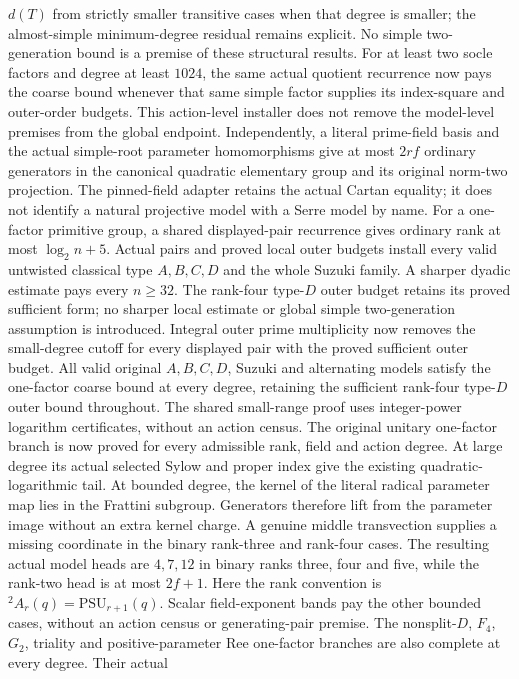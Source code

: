 $d(T)$ from strictly smaller transitive cases when that degree is smaller;
the almost-simple minimum-degree residual remains explicit. No simple
two-generation bound is a premise of these structural results.
For at least two socle factors and degree at least $1024$, the same
actual quotient recurrence now pays the coarse bound whenever that same
simple factor supplies its index-square and outer-order budgets. This
action-level installer does not remove the model-level premises from the
global endpoint. Independently, a literal prime-field basis and the
actual simple-root parameter homomorphisms give at most $2rf$ ordinary
generators in the canonical quadratic elementary group and its original
norm-two projection. The pinned-field adapter retains the actual Cartan
equality; it does not identify a natural projective model with a Serre
model by name.
For a one-factor primitive group, a shared displayed-pair recurrence
gives ordinary rank at most $\log_2 n+5$. Actual pairs and proved local
outer budgets install every valid untwisted classical type $A,B,C,D$ and
the whole Suzuki family. A sharper dyadic estimate pays every $n\geq32$.
The rank-four type-$D$ outer budget retains its proved sufficient form;
no sharper local estimate or global simple two-generation assumption is
introduced.
Integral outer prime multiplicity now removes the small-degree cutoff
for every displayed pair with the proved sufficient outer budget. All
valid original $A,B,C,D$, Suzuki and alternating models satisfy the
one-factor coarse bound at every degree, retaining the sufficient
rank-four type-$D$ outer bound throughout.
The shared small-range proof uses integer-power logarithm certificates,
without an action census.
The original unitary one-factor branch is now proved for every admissible
rank, field and action degree. At large degree its actual selected Sylow
and proper index give the existing quadratic-logarithmic tail. At
bounded degree, the kernel of the literal radical parameter map lies in
the Frattini subgroup. Generators therefore lift from the parameter
image without an extra kernel charge. A genuine middle transvection
supplies a missing coordinate in the binary rank-three and rank-four
cases. The resulting actual model heads are $4,7,12$ in binary ranks
three, four and five, while the rank-two head is at most $2f+1$.
Here the rank convention is ${}^2A_r(q)=\mathrm{PSU}_{r+1}(q)$.
Scalar field-exponent bands pay the other bounded cases, without an
action census or generating-pair premise.
The nonsplit-$D$, $F_4$, $G_2$, triality and positive-parameter Ree
one-factor branches are also complete at every degree. Their actual
